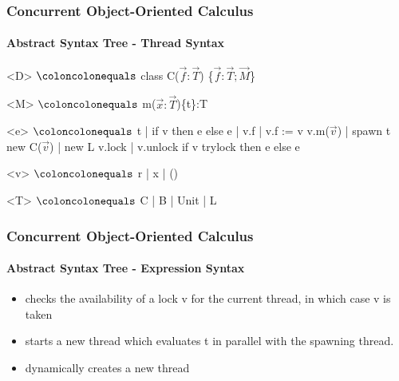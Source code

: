 \begin{frame}
\frametitle{Concurrent Object-Oriented Calculus}
\framesubtitle{Abstract Syntax Tree - Thread Syntax}
\begin{center}
  \begin{minipage}{0.8\linewidth}
    \begin{grammar}
    <D> $\coloncolonequals$ class C($\vec{f}:\vec{T}$) \{$\vec{f}:\vec{T}; \vec{M}$\}

    <M> $\coloncolonequals$ m($\vec{x}:\vec{T}$)\{t\}:T
\end{grammar}
    \hfill
\begin{grammar}
    <e> $\coloncolonequals$ t | if v then e else e | v.f | v.f := v 
        \indalt v.m($\vec{v}$) | spawn t
        \indalt new C($\vec{v}$) | new L 
        \indalt v.lock | v.unlock
        \indalt if v trylock then e else e 
    
    <v> $\coloncolonequals$ r | x | () 
    
    <T> $\coloncolonequals$ C | B | Unit | L
    \end{grammar}
\end{minipage}
\end{center}
\end{frame}



\begin{frame}
\frametitle{Concurrent Object-Oriented Calculus}
\framesubtitle{Abstract Syntax Tree - Expression Syntax}
\begin{center}
  \begin{minipage}{0.8\linewidth}
    \hfill
\end{minipage}
\end{center}
\begin{itemize}
    \item {} checks the availability of a lock v for the current thread, in which case v is taken
    \item {} starts a new thread which evaluates t in parallel with the spawning thread.
    \item {} dynamically creates a new thread
\end{itemize}
\end{frame}


